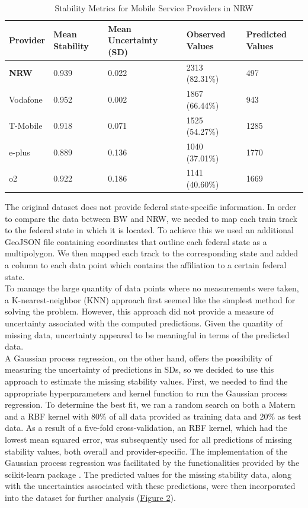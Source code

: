 \documentclass{article}
\theoremstyle{plain}
\theoremstyle{definition}
\theoremstyle{remark}
\begin{document}
\begin{table}[htbp]
\centering
\caption{Stability Metrics for Mobile Service Providers in \gls*{NRW}}
\label{tab:stability_metrics_nrw}
\begin{adjustbox}{width=\textwidth}
\begin{tabular}{@{}lllll@{}}
\toprule
\textbf{Provider} & \textbf{Mean Stability} & \textbf{Mean Uncertainty (SD)} & \textbf{Observed Values} & \textbf{Predicted Values} \\
\midrule
\textbf{\gls*{NRW}} & 0.939 & 0.022 & 2313 (82.31\%) & 497 \\
Vodafone & 0.952 & 0.002 & 1867 (66.44\%) & 943 \\
T-Mobile & 0.918 & 0.071 & 1525 (54.27\%) & 1285 \\
e-plus & 0.889 & 0.136 & 1040 (37.01\%) & 1770 \\
o2 & 0.922 & 0.186 & 1141 (40.60\%) & 1669 \\
\bottomrule
\end{tabular}
\end{adjustbox}
\end{table}
The original dataset does not provide federal state-specific information. In order to compare the data between BW and NRW, we needed to map each train track to the federal state in which it is located. To achieve this we used an additional GeoJSON file \citep{deutschlandGeoJSON} containing coordinates that outline each federal state as a multipolygon. We then mapped each track to the corresponding state and added a column to each data point which contains the affiliation to a certain federal state.
\newline
\\
To manage the large quantity of data points where no measurements were taken, a K-nearest-neighbor (KNN) approach first seemed like the simplest method for solving the problem. However, this approach did not provide a measure of uncertainty associated with the computed predictions. Given the quantity of missing data, uncertainty appeared to be meaningful in terms of the predicted data. 
\newline
\\
A Gaussian process regression, on the other hand, offers the possibility of measuring the uncertainty of predictions in \glspl*{SD}, so we decided to use this approach to estimate the missing stability values. First, we needed to find the appropriate hyperparameters and kernel function to run the Gaussian process regression. To determine the best fit, we ran a random search on both a Matern and a \gls*{RBF} kernel with 80\% of all data provided as training data and 20\% as test data. As a result of a five-fold cross-validation, an RBF kernel, which had the lowest mean squared error, was subsequently used for all predictions of missing stability values, both overall and provider-specific. The implementation of the Gaussian process regression was facilitated by the functionalities provided by the scikit-learn package \citep{scikit-learn}. The predicted values for the missing stability data, along with the uncertainties associated with these predictions, were then incorporated into the dataset for further analysis (\hyperref[fig:confidence]{Figure 2}).
\end{document}
